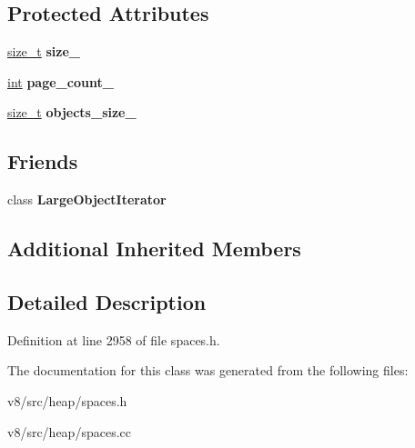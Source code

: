 \subsection*{Protected Attributes}
\begin{DoxyCompactItemize}
\item 
\mbox{\label{classv8_1_1internal_1_1LargeObjectSpace_a94dbac0e8d4b1dd98a8315786f9c07cf}} 
\mbox{\hyperlink{classsize__t}{size\+\_\+t}} {\bfseries size\+\_\+}
\item 
\mbox{\label{classv8_1_1internal_1_1LargeObjectSpace_ad6dfc04a22436ec514721204217a17fa}} 
\mbox{\hyperlink{classint}{int}} {\bfseries page\+\_\+count\+\_\+}
\item 
\mbox{\label{classv8_1_1internal_1_1LargeObjectSpace_a0615f0c56a1c3064a7f79596bc7d9c37}} 
\mbox{\hyperlink{classsize__t}{size\+\_\+t}} {\bfseries objects\+\_\+size\+\_\+}
\end{DoxyCompactItemize}
\subsection*{Friends}
\begin{DoxyCompactItemize}
\item 
\mbox{\label{classv8_1_1internal_1_1LargeObjectSpace_a3bc21bcf0ff3a8b52c6a491296fce3f2}} 
class {\bfseries Large\+Object\+Iterator}
\end{DoxyCompactItemize}
\subsection*{Additional Inherited Members}


\subsection{Detailed Description}


Definition at line 2958 of file spaces.\+h.



The documentation for this class was generated from the following files\+:\begin{DoxyCompactItemize}
\item 
v8/src/heap/spaces.\+h\item 
v8/src/heap/spaces.\+cc\end{DoxyCompactItemize}
